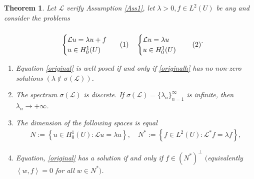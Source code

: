 \documentclass[
    a4paper,
    DIV=14,
    abstract=true,
    numbers=noenddot
]
{scrartcl}
\newtheorem{theorem}{Theorem}[section]
\theoremstyle{definition}
\newcommand{\br}[1]{\left\langle#1\right\rangle}
\newcommand{\set}[1]{\left\{#1\right\}}
\newcommand{\Ll}{\mathcal{L}}
\begin{document}
\begin{theorem}\label{well posednesss Fredholm}
    Let $\Ll$ verify Assumption \ref{Ass1}, let $\lambda>0, f \in L^2(U)$ be any and consider the problems
    \begin{align}
        \begin{minipage}{0.3\linewidth}
            \begin{equation}
                \begin{cases}
                    \Ll u = \lambda u+f \\
                    u \in H_0^1(U)
                \end{cases}\label{original}
            \end{equation}
        \end{minipage}%
        \begin{minipage}{0.3\linewidth}
            \begin{equation}
                \begin{cases}
                    \Ll u = \lambda u \\
                    u \in H_0^1(U)
                \end{cases}\label{originalh}
            \end{equation}
        \end{minipage}.
    \end{align}
    \begin{enumerate}
        \item Equation \eqref{original} is well posed if and only if \eqref{originalh} has no non-zero solutions  $(\lambda \notin \sigma(\Ll))$.
        \item The spectrum $\sigma (\Ll )$ is discrete. If $\sigma(\Ll )= \{\lambda_n \}_{n=1}^\infty$ is infinite, then $\lambda _n \to +\infty$.
        \item The dimension of the following  spaces is equal
              \begin{align*}
                  N:= \set{u \in H_0^1(U): \Ll u = \lambda u}, \quad N^*:= \set{f \in L^2(U): \Ll^* f = \lambda f},
              \end{align*}
        \item Equation, \eqref{original} has a solution if and only if $f \in (N^*)^\perp$ $($equivalently $\br{w,f}=0$ for all $w \in N^* )$.
    \end{enumerate}
\end{theorem}
\end{document}
